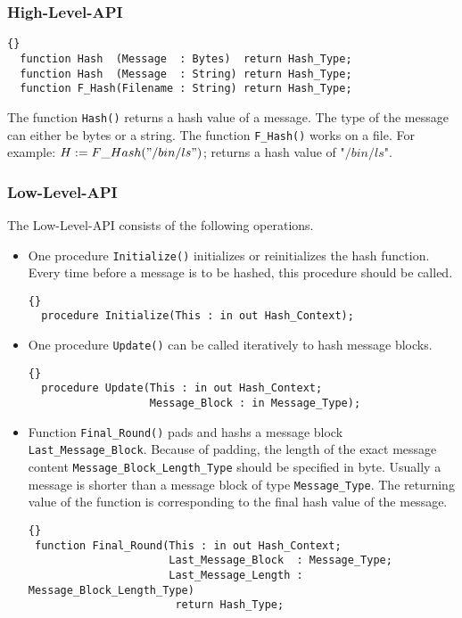 \subsubsection*{High-Level-API}
\begin{lstlisting}{}
  function Hash  (Message  : Bytes)  return Hash_Type;
  function Hash  (Message  : String) return Hash_Type;
  function F_Hash(Filename : String) return Hash_Type;
\end{lstlisting}
The function \texttt{Hash()} returns a hash value of a message. The
type of the message can either be bytes or a string. The function
\texttt{F\_Hash()} works on a file. For example:
$H:=F\_Hash("/bin/ls")$; returns a hash value of "$/bin/ls$".

\subsubsection*{Low-Level-API}
The Low-Level-API consists of the following operations.
\begin{itemize}
\item One procedure \texttt{Initialize()} initializes or reinitializes the hash function. Every time before a message is to be hashed, this
  procedure should be called.
\begin{lstlisting}{}
  procedure Initialize(This : in out Hash_Context);
\end{lstlisting}
\item One procedure \texttt{Update()} can be called iteratively to hash
  message blocks.
\begin{lstlisting}{}
  procedure Update(This : in out Hash_Context;
                   Message_Block : in Message_Type);
\end{lstlisting}
\item Function \texttt{Final\_Round()} pads and hashs a message block
  \texttt{Last\_Message\_Block}. Because of padding, the length of the
  exact message content \texttt{Message\_Block\_Length\_Type} should
  be specified in byte. Usually a message is shorter than a message
  block of type \texttt{Message\_Type}. The returning value of the
  function is corresponding to the final hash value of the message.
\begin{lstlisting}{}
 function Final_Round(This : in out Hash_Context;
                      Last_Message_Block  : Message_Type;
                      Last_Message_Length : Message_Block_Length_Type)
                       return Hash_Type;
\end{lstlisting}
\end{itemize}

